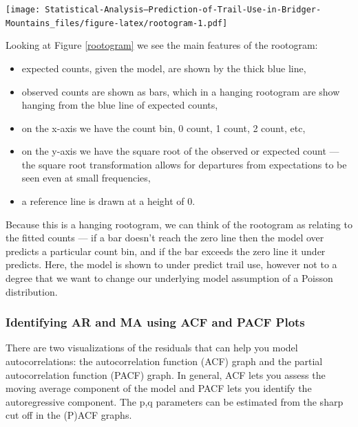 \documentclass[
]{book}
\newenvironment{Shaded}{\begin{snugshade}}{\end{snugshade}}
\newcommand{\FunctionTok}[1]{\textcolor[rgb]{0.00,0.00,0.00}{#1}}
\newcommand{\NormalTok}[1]{#1}
\newcommand{\OtherTok}[1]{\textcolor[rgb]{0.56,0.35,0.01}{#1}}
\newcommand{\SpecialCharTok}[1]{\textcolor[rgb]{0.00,0.00,0.00}{#1}}
\providecommand{\tightlist}{%
  \setlength{\itemsep}{0pt}\setlength{\parskip}{0pt}}
\begin{document}
\begin{Shaded}
\end{Shaded}

\texttt{[image: Statistical-Analysis--Prediction-of-Trail-Use-in-Bridger-Mountains\_files/figure-latex/rootogram-1.pdf]}

Looking at Figure \ref{rootogram} we see the main features of the rootogram:

\begin{itemize}
\tightlist
\item
  expected counts, given the model, are shown by the thick blue line,
\item
  observed counts are shown as bars, which in a hanging rootogram are show hanging from the blue line of expected counts,
\item
  on the x-axis we have the count bin, 0 count, 1 count, 2 count, etc,
\item
  on the y-axis we have the square root of the observed or expected count --- the square root transformation allows for departures from expectations to be seen even at small frequencies,
\item
  a reference line is drawn at a height of 0.
\end{itemize}

Because this is a hanging rootogram, we can think of the rootogram as relating to the fitted counts --- if a bar doesn't reach the zero line then the model over predicts a particular count bin, and if the bar exceeds the zero line it under predicts. Here, the model is shown to under predict trail use, however not to a degree that we want to change our underlying model assumption of a Poisson distribution.

\hypertarget{ACF}{%
\subsubsection{Identifying AR and MA using ACF and PACF Plots}\label{ACF}}

There are two visualizations of the residuals that can help you model autocorrelations: the autocorrelation function (ACF) graph and the partial autocorrelation function (PACF) graph. In general, ACF lets you assess the moving average component of the model and PACF lets you identify the autoregressive component. The p,q parameters can be estimated from the sharp cut off in the (P)ACF graphs.
\end{document}
